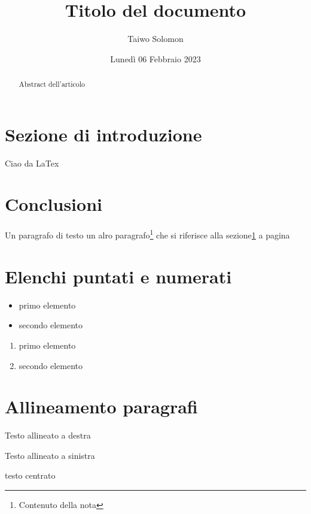 \documentclass{article}
\title{Titolo del documento}
\author{Taiwo Solomon}
\date{Lunedì 06 Febbraio 2023}
\begin{document}
\maketitle

\begin{abstract}
    Abstract dell'articolo
\end{abstract}

\tableofcontents

\section{Sezione di introduzione}\label{sec:prova}
Ciao da LaTex

\section*{Conclusioni}
Un paragrafo di testo
un alro paragrafo\footnote{Contenuto della nota} che si riferisce alla sezione\ref{sec:prova} a pagina\pageref{sec:prova}

\section{Elenchi puntati e numerati}

\begin{itemize}
    \item primo elemento
    \item secondo elemento
\end{itemize}

\begin{enumerate}
    \item primo elemento
    \item secondo elemento
\end{enumerate}

\section{Allineamento paragrafi}

\begin{flushright}
    Testo allineato a destra
\end{flushright}

\begin{flushleft}
    Testo allineato a sinistra
\end{flushleft}

\begin{center}
    testo centrato
\end{center}
\end{document}
